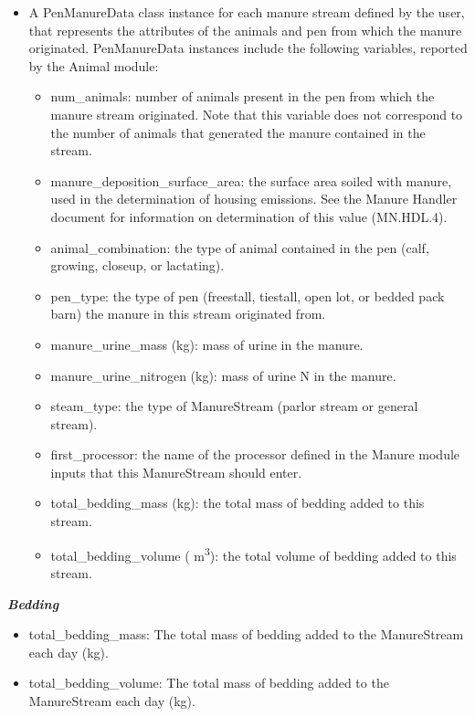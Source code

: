 \begin{refsection}
\begin{itemize}
    \item A PenManureData class instance for each manure stream defined by the user, that represents the attributes of the animals and pen from which the manure originated. PenManureData instances include the following variables, reported by the Animal module:
    \begin{itemize}
        \item num\_animals: number of animals present in the pen from which the manure stream originated. Note that this variable does not correspond to the number of animals that generated the manure contained in the stream.
        \item manure\_deposition\_surface\_area: the surface area soiled with manure, used in the determination of housing emissions. See the Manure Handler document for information on determination of this value (MN.HDL.4). 
        \item animal\_combination: the type of animal contained in the pen (calf, growing, closeup, or lactating).
        \item pen\_type: the type of pen (freestall, tiestall, open lot, or bedded pack barn) the manure in this stream originated from. 
        \item manure\_urine\_mass (kg): mass of urine in the manure.
        \item manure\_urine\_nitrogen (kg): mass of urine N in the manure.
        \item steam\_type: the type of ManureStream (parlor stream or general stream).
        \item first\_processor: the name of the processor defined in the Manure module inputs that this ManureStream should enter. 
        \item total\_bedding\_mass (kg): the total mass of bedding added to this stream. 
        \item total\_bedding\_volume ( m\textsuperscript{3}): the total volume of bedding added to this stream.
    \end{itemize}
\end{itemize}
\textbf{\textit{Bedding}}
\begin{itemize}
    \item total\_bedding\_mass: The total mass of bedding added to the ManureStream each day (kg).
    \item total\_bedding\_volume: The total mass of bedding added to the ManureStream each day (kg).
\end{itemize}




\end{refsection}

